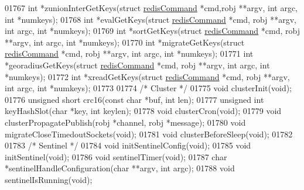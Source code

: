 \begin{DoxyCode}
{{{{{{{01767 \textcolor{keywordtype}{int} *zunionInterGetKeys(\textcolor{keyword}{struct} \hyperlink{structredisCommand}{redisCommand} *cmd,robj **argv, \textcolor{keywordtype}{int} argc, \textcolor{keywordtype}{int} *numkeys);
01768 \textcolor{keywordtype}{int} *evalGetKeys(\textcolor{keyword}{struct} \hyperlink{structredisCommand}{redisCommand} *cmd, robj **argv, \textcolor{keywordtype}{int} argc, \textcolor{keywordtype}{int} *numkeys);
01769 \textcolor{keywordtype}{int} *sortGetKeys(\textcolor{keyword}{struct} \hyperlink{structredisCommand}{redisCommand} *cmd, robj **argv, \textcolor{keywordtype}{int} argc, \textcolor{keywordtype}{int} *numkeys);
01770 \textcolor{keywordtype}{int} *migrateGetKeys(\textcolor{keyword}{struct} \hyperlink{structredisCommand}{redisCommand} *cmd, robj **argv, \textcolor{keywordtype}{int} argc, \textcolor{keywordtype}{int} *numkeys);
01771 \textcolor{keywordtype}{int} *georadiusGetKeys(\textcolor{keyword}{struct} \hyperlink{structredisCommand}{redisCommand} *cmd, robj **argv, \textcolor{keywordtype}{int} argc, \textcolor{keywordtype}{int} *numkeys);
01772 \textcolor{keywordtype}{int} *xreadGetKeys(\textcolor{keyword}{struct} \hyperlink{structredisCommand}{redisCommand} *cmd, robj **argv, \textcolor{keywordtype}{int} argc, \textcolor{keywordtype}{int} *numkeys);
01773 
01774 \textcolor{comment}{/* Cluster */}
01775 \textcolor{keywordtype}{void} clusterInit(\textcolor{keywordtype}{void});
01776 \textcolor{keywordtype}{unsigned} \textcolor{keywordtype}{short} crc16(\textcolor{keyword}{const} \textcolor{keywordtype}{char} *buf, \textcolor{keywordtype}{int} len);
01777 \textcolor{keywordtype}{unsigned} \textcolor{keywordtype}{int} keyHashSlot(\textcolor{keywordtype}{char} *key, \textcolor{keywordtype}{int} keylen);
01778 \textcolor{keywordtype}{void} clusterCron(\textcolor{keywordtype}{void});
01779 \textcolor{keywordtype}{void} clusterPropagatePublish(robj *channel, robj *message);
01780 \textcolor{keywordtype}{void} migrateCloseTimedoutSockets(\textcolor{keywordtype}{void});
01781 \textcolor{keywordtype}{void} clusterBeforeSleep(\textcolor{keywordtype}{void});
01782 
01783 \textcolor{comment}{/* Sentinel */}
01784 \textcolor{keywordtype}{void} initSentinelConfig(\textcolor{keywordtype}{void});
01785 \textcolor{keywordtype}{void} initSentinel(\textcolor{keywordtype}{void});
01786 \textcolor{keywordtype}{void} sentinelTimer(\textcolor{keywordtype}{void});
01787 \textcolor{keywordtype}{char} *sentinelHandleConfiguration(\textcolor{keywordtype}{char} **argv, \textcolor{keywordtype}{int} argc);
01788 \textcolor{keywordtype}{void} sentinelIsRunning(\textcolor{keywordtype}{void});
}}}}}}}
\end{DoxyCode}
